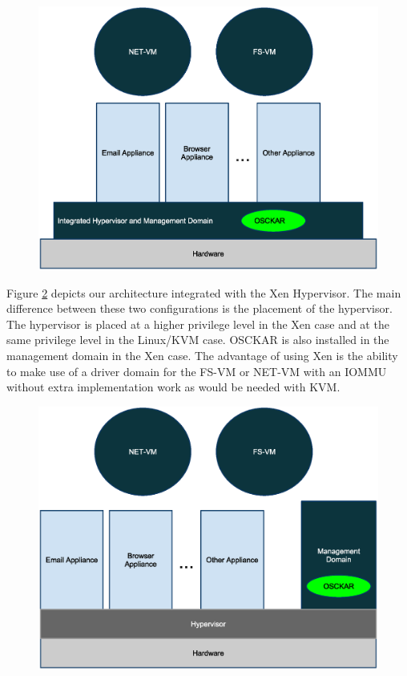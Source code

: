 \begin{figure}[tbp]
\begin{centering}
\label{fig:IntegratedHypervisor}
\includegraphics[scale=1.0,angle=90]{figs/IntegratedHypervisorArchitecture}
\end{centering}
\end{figure}

Figure \ref{fig:StandAloneHypervisor} depicts our architecture integrated with the Xen Hypervisor. The main difference between these two configurations is the placement of the hypervisor. The hypervisor is placed at a higher privilege level in the Xen case and at the same privilege level in the Linux/KVM case. OSCKAR is also installed in the management domain in the Xen case. The advantage of using Xen is the ability to make use of a driver domain for the FS-VM or NET-VM with an IOMMU without extra implementation work as would be needed with KVM.

\begin{figure}[tbp]
\begin{centering}
\label{fig:StandAloneHypervisor}
\includegraphics[scale=1.0,angle=90]{figs/StandAloneHypervisorArchitecture}
\end{centering}
\end{figure}

